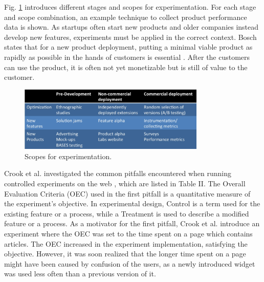 \documentclass[conference]{IEEEtran}
\begin{document}
Fig. \ref{fig4} introduces different stages and scopes for experimentation. For each stage and scope combination, an example technique to collect product performance data is shown. As startups often start new products and older companies instead develop new features, experiments must be applied in the correct context. Bosch states that for a new product deployment, putting a minimal viable product as rapidly as possible in the hands of customers is essential \cite{bosch2012building}. After the customers can use the product, it is often not yet monetizable but is still of value to the customer. %
\begin{figure}[H]
	\centering
	\includegraphics[width=3.5in]{bosch.jpg}
	\caption{Scopes for experimentation\cite{bosch2012building}.}
	\label{fig4}
\end{figure}
Crook et al. investigated the common pitfalls encountered when running controlled experiments on the web \cite{crook2009seven}, which are listed in Table II. The Overall Evaluation Criteria (OEC) used in the first pitfall is a quantitative measure of the experiment's objective. In experimental design, Control is a term used for the existing feature or a process, while a Treatment is used to describe a modified feature or a process. As a motivator for the first pitfall, Crook et al. introduce an experiment where the OEC was set to the time spent on a page which contains articles. The OEC increased in the experiment implementation, satisfying the objective. However, it was soon realized that the longer time spent on a page might have been caused by confusion of the users, as a newly introduced widget was used less often than a previous version of it. 
\end{document}
